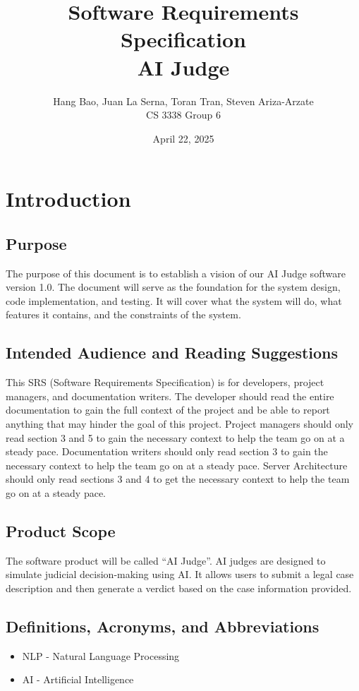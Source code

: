 \documentclass[12pt]{article}
\title{\textbf{Software Requirements Specification}\\[1ex] \Large AI Judge}
\author{Hang Bao, Juan La Serna, Toran Tran, Steven Ariza-Arzate\\CS 3338 Group 6}
\date{April 22, 2025}
\begin{document}
\maketitle
\tableofcontents
\newpage
\section{Introduction}
\subsection{Purpose}
The purpose of this document is to establish a vision of our AI Judge software version 1.0. The document will serve as the foundation for the system design, code implementation, and testing. It will cover what the system will do, what features it contains, and the constraints of the system.

\subsection{Intended Audience and Reading Suggestions}

This SRS (Software Requirements Specification) is for developers, project managers, and documentation writers. The developer should read the entire documentation to gain the full context of the project and be able to report anything that may hinder the goal of this project. Project managers should only read section 3 and 5 to gain the necessary context to help the team go on at a steady pace. Documentation writers should only read section 3 to gain the necessary context to help the team go on at a steady pace. Server Architecture should only read sections 3 and 4 to get the necessary context to help the team go on at a steady pace.

\subsection{Product Scope}

The software product will be called ``AI Judge''. AI judges are designed to simulate judicial decision-making using AI. It allows users to submit a legal case description and then generate a verdict based on the case information provided.

\subsection{Definitions, Acronyms, and Abbreviations}

\begin{itemize}
    \item NLP - Natural Language Processing
    \item AI - Artificial Intelligence
\end{itemize}
\end{document}
